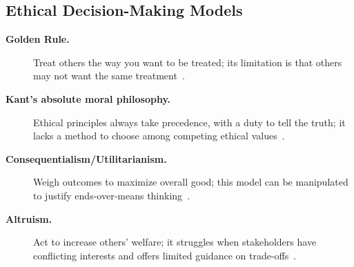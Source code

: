 \documentclass[../main.tex]{subfiles}
\begin{document}
\subsection{Ethical Decision-Making Models}
\begin{description}
  \item[\textbf{Golden Rule.}] Treat others the way you want to be treated; its limitation is that others may not want the same treatment~\autocite{edo-5-1-3-ethics-and-acquisition-2025}.
  \item[\textbf{Kant's absolute moral philosophy.}] Ethical principles always take precedence, with a duty to tell the truth; it lacks a method to choose among competing ethical values~\autocite{edo-5-1-3-ethics-and-acquisition-2025}.
  \item[\textbf{Consequentialism/Utilitarianism.}] Weigh outcomes to maximize overall good; this model can be manipulated to justify ends-over-means thinking~\autocite{edo-5-1-3-ethics-and-acquisition-2025}.
  \item[\textbf{Altruism.}] Act to increase others' welfare; it struggles when stakeholders have conflicting interests and offers limited guidance on trade-offs~\autocite{edo-5-1-3-ethics-and-acquisition-2025}.
\end{description}
\end{document}
